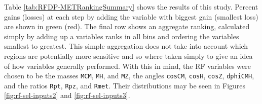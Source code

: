 Table \ref{tab:RFDP-METRankingSummary} shows the results of this study.  Percent gains (losses) at each step by adding the variable with biggest gain (smallest loss) are shown in green (red).  The final row shows an aggregate ranking, calculated simply by adding up a variables ranks in all bins and ordering the variables smallest to greatest.  This simple aggregation does not take into account which regions are potentially more sensitive and so where taken simply to give an idea of how variables generally performed.  With this in mind, the RF variables were chosen to be the masses \texttt{MCM}, \texttt{MH}, and \texttt{MZ}, the angles \texttt{cosCM}, \texttt{cosH}, \texttt{cosZ}, \texttt{dphiCMH}, and the ratios \texttt{Rpt}, \texttt{Rpz}, and \texttt{Rmet}.  Their distributions may be seen in Figures \ref{fig:rf-sel-inputs2} and \ref{fig:rf-sel-inputs3}.  %

